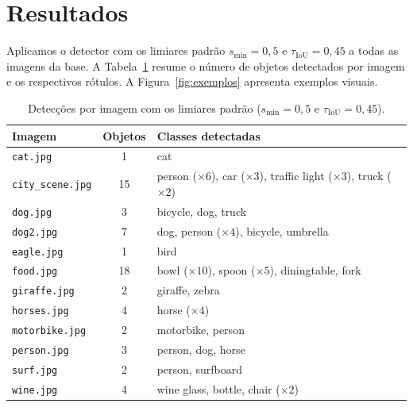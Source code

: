 \documentclass[11pt,a4paper]{article}
\begin{document}
\section{Resultados}

Aplicamos o detector com os limiares padrão $s_{\min} = 0{,}5$ e $\tau_{\mathrm{IoU}} = 0{,}45$ a todas as imagens da base. A Tabela~\ref{tab:resultados} resume o número de objetos detectados por imagem e os respectivos rótulos. A Figura~\ref{fig:exemplos} apresenta exemplos visuais.

\begin{table}[H]
\centering
\caption{Detecções por imagem com os limiares padrão ($s_{\min}=0{,}5$ e $\tau_{\mathrm{IoU}}=0{,}45$).}
\label{tab:resultados}
\small
\begin{tabularx}{\linewidth}{l c X}
\toprule
\textbf{Imagem} & \textbf{Objetos} & \textbf{Classes detectadas} \\
\midrule
\texttt{cat.jpg}        & 1  & cat \\
\texttt{city\_scene.jpg} & 15 & person ($\times 6$), car ($\times 3$), traffic light ($\times 3$), truck ($\times 2$) \\
\texttt{dog.jpg}        & 3  & bicycle, dog, truck \\
\texttt{dog2.jpg}       & 7  & dog, person ($\times 4$), bicycle, umbrella \\
\texttt{eagle.jpg}      & 1  & bird \\
\texttt{food.jpg}       & 18 & bowl ($\times 10$), spoon ($\times 5$), diningtable, fork \\
\texttt{giraffe.jpg}    & 2  & giraffe, zebra \\
\texttt{horses.jpg}     & 4  & horse ($\times 4$) \\
\texttt{motorbike.jpg}  & 2  & motorbike, person \\
\texttt{person.jpg}     & 3  & person, dog, horse \\
\texttt{surf.jpg}       & 2  & person, surfboard \\
\texttt{wine.jpg}       & 4  & wine glass, bottle, chair ($\times 2$) \\
\bottomrule
\end{tabularx}
\end{table}
\end{document}
